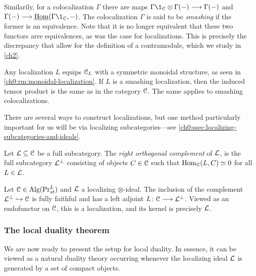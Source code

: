 \begin{remark}
    Similarily, for a colocalization $\Gamma$ there are maps $\Gamma \1_\C \otimes \Gamma(-)\longrightarrow \Gamma (-)$ and $\Gamma(-)\longrightarrow \iHom(\Gamma \1_\C, -)$. The colocalization $\Gamma$ is said to be \emph{smashing} if the former is an equivalence. Note that it is no longer equivalent that these two functors arre equivalences, as was the case for localizations. This is precisely the discrepancy that allow for the definition of a contramodule, which we study in \cref{ch2}. 
\end{remark}

\begin{remark}
    Any localization $L$ equips $\EuScript{C}_L$ with a symmetric monoidal structure, as seen in \cref{ch0:rm:monoidal-localization}. If $L$ is a smashing localization, then the induced tensor product is the same as in the category $\EuScript{C}$. The same applies to smashing colocalizations. 
\end{remark}

There are several ways to construct localizations, but one method particularly important for us will be via localizing subcategories---see \cref{ch0:ssec:localizing-subcategories-and-ideals}. 

\begin{definition}
    \label{ch0:def:left-orthogonal-complement}
    Let $\mathcal{L}\subseteq \EuScript{C}$ be a full subcategory. The \emph{right orthogonal complement} of $\mathcal{L}$, is the full subcategory $\mathcal{L}^\perp$ consisting of objects $C\in \EuScript{C}$ such that $\operatorname{Hom}_{\EuScript{C}}(L,C)\simeq 0$ for all $L\in \mathcal{L}$.  
\end{definition}

\begin{example}
    \label{ch0:ex:localization-from-localizing-subcategory}
    Let $\EuScript{C}\in \operatorname{Alg}(\mathrm{Pr}_{st}^L)$ and $\mathcal{L}$ a localizing $\otimes$-ideal. The inclusion of the complement $\mathcal{L}^\perp \hookrightarrow \EuScript{C}$ is fully faithful and has a left adjoint $L\colon \EuScript{C}\longrightarrow \mathcal{L}^\perp$. Viewed as an endofunctor on $\EuScript{C}$, this is a localization, and its kernel is precisely $\mathcal{L}$. 
\end{example}



\subsubsection{The local duality theorem}

We are now ready to present the setup for local duality. In essence, it can be viewed as a natural duality theory occurring whenever the localizing ideal $\mathcal{L}$ is generated by a set of compact objects. 

